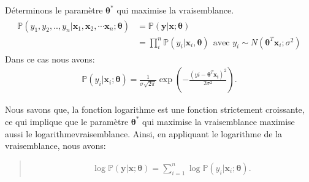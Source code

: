 \documentclass[letterpaper,11pt,english]{sphinxmanual}
\begin{document}
\begin{itemize}
\sphinxAtStartPar
Déterminons le paramètre \(\boldsymbol{\theta} ^{*}\) qui
maximise la vraisemblance.
\begin{equation}\label{equation:chapter3:chapter3:1}
\begin{split}\begin{aligned}
  \mathbb{P}(y_1, y_2,.., y_n|  \mathbf{x}_1, \mathbf{x}_2, \cdots \mathbf{x}_n; \boldsymbol{\theta}) &= \mathbb{P}(\mathbf{y}|\mathbf{x}; \boldsymbol{\theta})
  \\
  &= \prod_{i}^{n}\mathbb{P}(y_i| \mathbf{x}_i, \boldsymbol{\theta})~~ \text{avec }  y_i \sim N(\boldsymbol{\theta}^T \mathbf{x}_i; \sigma^2)\end{aligned}\end{split}
\end{equation}
\sphinxAtStartPar
Dans ce cas nous avons:
\begin{equation}\label{equation:chapter3:chapter3:2}
\begin{split}\mathbb{P}(y_i| \mathbf{x}_i; \boldsymbol{\theta}) = \frac{1}{\sigma \sqrt{2\pi }}\exp \left(-\frac{(yi - \boldsymbol{\theta}^T \mathbf{x_i})^2}{2 \sigma^2}\right).\end{split}
\end{equation}
\begin{DUlineblock}{0em}
\item[] Nous savons que, la fonction logarithme est une fonction
strictement croissante, ce qui implique que le paramètre
\(\boldsymbol{\theta} ^*\) qui maximise la vraisemblance
maximise aussi le logarithme\sphinxhyphen{}vraisemblance. Ainsi, en appliquant le
logarithme de la vraisemblance, nous avons:
\item[] 
\end{DUlineblock}
\begin{quote}
\begin{equation}\label{equation:chapter3:chapter3:3}
\begin{split}\log \mathbb{P}(\mathbf{y}|  \mathbf{x}; \boldsymbol{\theta}) = \sum_{i=1}^{n} \log \mathbb{P}(y_i| \mathbf{x}_i; \boldsymbol{\theta}).\end{split}
\end{equation}\end{quote}


\end{itemize}
\end{document}
